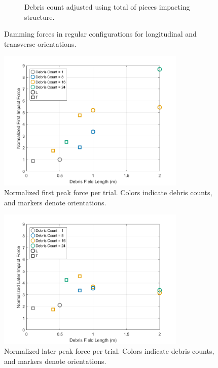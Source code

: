 \documentclass{article}
\begin{document}
{\begin{figure}[htbp]
\begin{subfigure}[t]{0.9\textwidth}
        \caption{Debris count adjusted using total of pieces impacting structure.}
        \label{fig:damming_regular_remap}
    \end{subfigure}
    \caption{Damming forces  in regular configurations for longitudinal and transverse orientations.}
    \label{fig:damming_regular_split}
\end{figure}

\begin{figure}[htbp]
    \centering
    \includegraphics[width=0.8\textwidth]{figures/Normalized_FirstPeak.png}
    \caption{Normalized first peak force per trial. Colors indicate debris counts, and markers denote orientations.}
    \label{fig:first_peak}
\end{figure}

\begin{figure}[htbp]
    \centering
    \includegraphics[width=0.8\textwidth]{figures/Normalized_LaterPeak.png}
    \caption{Normalized later peak force per trial. Colors indicate debris counts, and markers denote orientations.}
    \label{fig:later_peak}
\end{figure}

}
\end{document}
